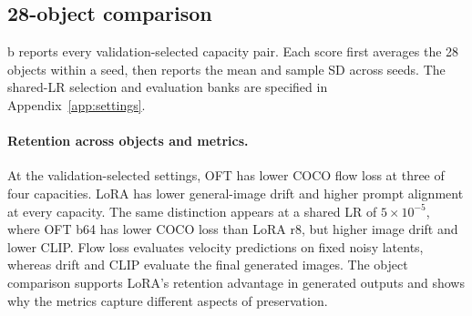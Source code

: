 \subsection{28-object comparison}
b reports every validation-selected capacity pair. Each score first averages the 28 objects within a seed, then reports the mean and sample SD across seeds. The shared-LR selection and evaluation banks are specified in Appendix~\ref{app:settings}.

\paragraph{Retention across objects and metrics.}
At the validation-selected settings, OFT has lower COCO flow loss at three of four capacities. LoRA has lower general-image drift and higher prompt alignment at every capacity. The same distinction appears at a shared LR of $5\times10^{-5}$, where OFT b64 has lower COCO loss than LoRA r8, but higher image drift and lower CLIP. Flow loss evaluates velocity predictions on fixed noisy latents, whereas drift and CLIP evaluate the final generated images. The object comparison supports LoRA's retention advantage in generated outputs and shows why the metrics capture different aspects of preservation.
